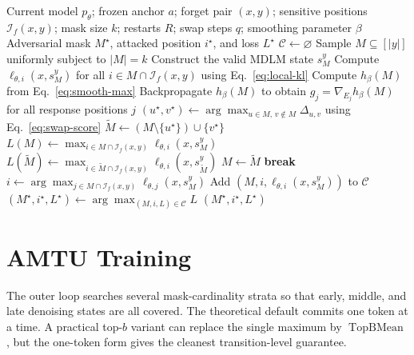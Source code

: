 \documentclass[11pt]{article}
\newcommand{\Iforget}{\mathcal{I}_{f}}
\newcommand{\TopBMean}{\operatorname{TopBMean}}
\begin{document}
\begin{algorithm}[t]
\caption{Cardinality-Preserving Adversarial Mask Search}
\label{alg:mask-search}
\begin{algorithmic}[1]
\Require Current model $p_\theta$; frozen anchor $a$; forget pair $(x,y)$;
         sensitive positions $\Iforget(x,y)$; mask size $k$; restarts $R$;
         swap steps $q$; smoothing parameter $\beta$
\Ensure Adversarial mask $M^{\star}$, attacked position $i^{\star}$, and loss $L^{\star}$
\State $\mathcal{C}\gets\varnothing$
    \State Sample $M\subseteq[|y|]$ uniformly subject to $|M|=k$
        \State Construct the valid MDLM state $s_M^y$
        \State Compute $\ell_{\theta,i}(x,s_M^y)$ for all $i\in M\cap\Iforget(x,y)$ using Eq.~\eqref{eq:local-kl}
        \State Compute $h_\beta(M)$ from Eq.~\eqref{eq:smooth-max}
        \State Backpropagate $h_\beta(M)$ to obtain $g_j=\nabla_{E_j}h_\beta(M)$ for all response positions $j$
        \State $(u^{\star},v^{\star})\gets
        \displaystyle\arg\max_{u\in M,\,v\notin M}\Delta_{u,v}$ using Eq.~\eqref{eq:swap-score}
        \State $\widetilde{M}\gets(M\setminus\{u^{\star}\})\cup\{v^{\star}\}$
        \State $L(M)\gets\displaystyle\max_{i\in M\cap\Iforget(x,y)}\ell_{\theta,i}(x,s_M^y)$
        \State $L(\widetilde{M})\gets\displaystyle\max_{i\in \widetilde{M}\cap\Iforget(x,y)}\ell_{\theta,i}(x,s_{\widetilde{M}}^y)$
            \State $M\gets\widetilde{M}$
        \Else
            \State \textbf{break}
        \EndIf
    \EndFor
    \State $i\gets\displaystyle\arg\max_{j\in M\cap\Iforget(x,y)}\ell_{\theta,j}(x,s_M^y)$
    \State Add $(M,i,\ell_{\theta,i}(x,s_M^y))$ to $\mathcal{C}$
\EndFor
\State $(M^{\star},i^{\star},L^{\star})\gets\displaystyle\arg\max_{(M,i,L)\in\mathcal{C}}L$
\State \Return $(M^{\star},i^{\star},L^{\star})$
\end{algorithmic}
\end{algorithm}

\section{AMTU Training}

The outer loop searches several mask-cardinality strata so that early, middle,
and late denoising states are all covered.  The theoretical default commits one
token at a time.  A practical top-$b$ variant can replace the single maximum by
$\TopBMean$, but the one-token form gives the cleanest transition-level guarantee.
\end{document}
